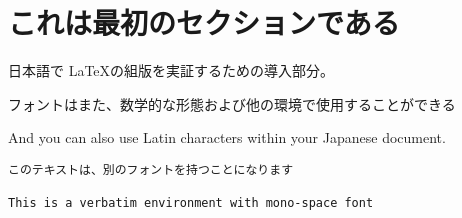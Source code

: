 \documentclass{article}
\begin{document}
\section{これは最初のセクションである}
日本語で \LaTeX の組版を実証するための導入部分。

フォントはまた、数学的な形態および他の環境で使用することができる

\bigskip

And you can also use Latin characters within your Japanese document.

\bigskip

\begin{verbatim}
このテキストは、別のフォントを持つことになります

This is a verbatim environment with mono-space font
\end{verbatim}
\end{document}
